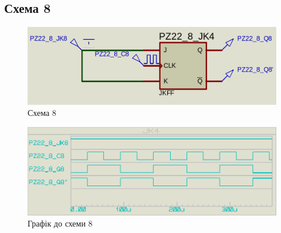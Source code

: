 \documentclass{article}
\begin{document}
\begin{normalsize}
	\section*{Схема 8}	
	\begin{figure}[H]
		\centering
		\includegraphics[scale=0.25]{s8}	
		\caption{Схема 8}
	\end{figure}
	
	\begin{figure}[H]
		\centering
		\includegraphics[scale=0.25]{g8}	
		\caption{Графік до схеми 8}
	\end{figure}


\end{normalsize}
\end{document}
